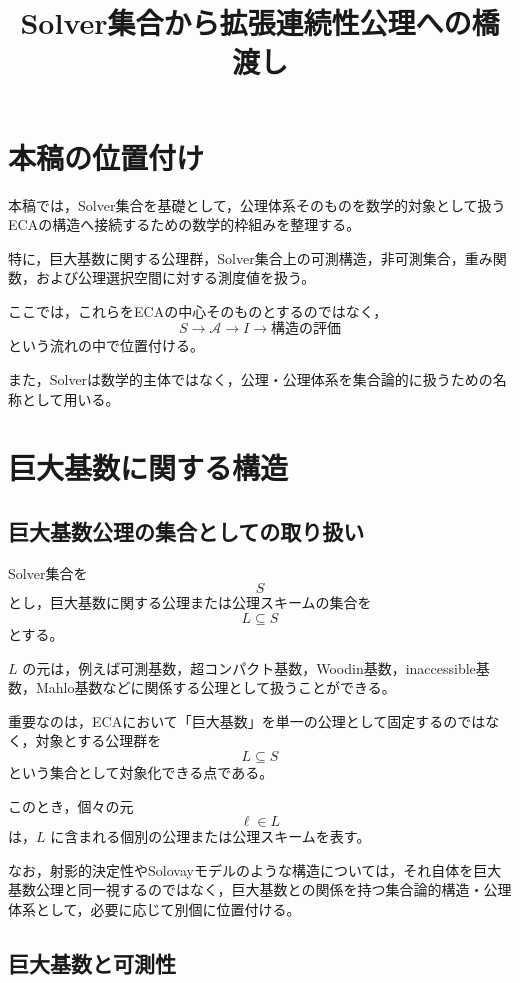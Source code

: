 \documentclass[12pt,a4paper]{article}
\title{Solver集合から拡張連続性公理への橋渡し}
\author{}
\date{}
\begin{document}
\maketitle

\section{本稿の位置付け}

本稿では，Solver集合を基礎として，公理体系そのものを数学的対象として扱うECAの構造へ接続するための数学的枠組みを整理する。

特に，巨大基数に関する公理群，Solver集合上の可測構造，非可測集合，重み関数，および公理選択空間に対する測度値を扱う。

ここでは，これらをECAの中心そのものとするのではなく，
\[
S
\longrightarrow
\mathscr{A}
\longrightarrow
I
\longrightarrow
\text{構造の評価}
\]
という流れの中で位置付ける。

また，Solverは数学的主体ではなく，公理・公理体系を集合論的に扱うための名称として用いる。

\section{巨大基数に関する構造}

\subsection{巨大基数公理の集合としての取り扱い}

Solver集合を
\[
S
\]
とし，巨大基数に関する公理または公理スキームの集合を
\[
L\subseteq S
\]
とする。

$L$ の元は，例えば可測基数，超コンパクト基数，Woodin基数，inaccessible基数，Mahlo基数などに関係する公理として扱うことができる。

重要なのは，ECAにおいて「巨大基数」を単一の公理として固定するのではなく，対象とする公理群を
\[
L\subseteq S
\]
という集合として対象化できる点である。

このとき，個々の元
\[
\ell\in L
\]
は，$L$ に含まれる個別の公理または公理スキームを表す。

なお，射影的決定性やSolovayモデルのような構造については，それ自体を巨大基数公理と同一視するのではなく，巨大基数との関係を持つ集合論的構造・公理体系として，必要に応じて別個に位置付ける。

\subsection{巨大基数と可測性}
\end{document}
